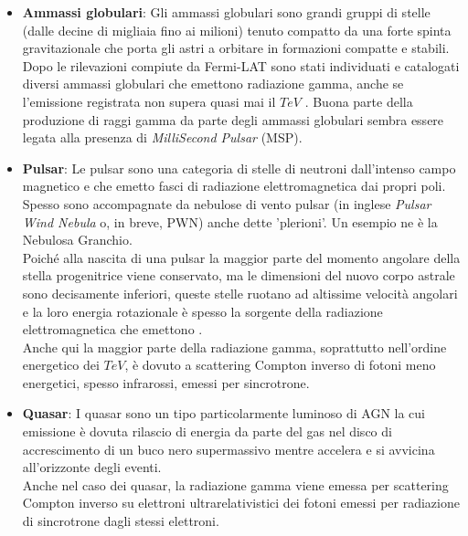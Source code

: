 \documentclass[10pt]{article}
\begin{document}
\begin{itemize}
	Quando poi il processo termina nel collasso in buco nero, si genera un potente getto, il che causa una seconda onda d'urto all'interno del guscio. Ciò provoca una  \textit{ultrarelativistic photospheric breakout} e l'emissione di fotoni gamma in un ampio angolo solido centrato sull'asse della coalescenza \cite{REGrNSM}.
	\item \textbf{Ammassi globulari}: Gli ammassi globulari sono grandi gruppi di stelle (dalle decine di migliaia fino ai milioni) tenuto compatto da una forte spinta gravitazionale che porta gli astri a orbitare in formazioni compatte e stabili.\\
	Dopo le rilevazioni compiute da Fermi-LAT sono stati individuati e catalogati diversi ammassi globulari che emettono radiazione gamma, anche se l'emissione registrata non supera quasi mai il $ \unit{TeV} $ \cite{GrEGC}. Buona parte della produzione di raggi gamma da parte degli ammassi globulari sembra essere legata alla presenza di \textit{MilliSecond Pulsar} (MSP).
	\item \textbf{Pulsar}: Le pulsar sono una categoria di stelle di neutroni dall'intenso campo magnetico e che emetto fasci di radiazione elettromagnetica dai propri poli. Spesso sono accompagnate da nebulose di vento pulsar (in inglese \textit{Pulsar Wind Nebula} o, in breve, PWN) anche dette 'plerioni'. Un esempio ne è la Nebulosa Granchio.\\
	Poiché alla nascita di una pulsar la maggior parte del momento angolare della stella progenitrice viene conservato, ma le dimensioni del nuovo corpo astrale sono decisamente inferiori, queste stelle ruotano ad altissime velocità angolari e la loro energia rotazionale è spesso la sorgente della radiazione elettromagnetica che emettono \cite{GrPE}.\\
	Anche qui la maggior parte della radiazione gamma, soprattutto nell'ordine energetico dei $ \unit{TeV} $, è dovuto a scattering Compton inverso di fotoni meno energetici, spesso infrarossi, emessi per sincrotrone.
	\item \textbf{Quasar}: I quasar sono un tipo particolarmente luminoso di AGN la cui emissione è dovuta rilascio di energia da parte del gas nel disco di accrescimento di un buco nero supermassivo mentre accelera e si avvicina all'orizzonte degli eventi.\\
	Anche nel caso dei quasar, la radiazione gamma viene emessa per scattering Compton inverso su elettroni ultrarelativistici dei fotoni emessi per radiazione di sincrotrone dagli stessi elettroni.\\

\end{itemize}
\end{document}
